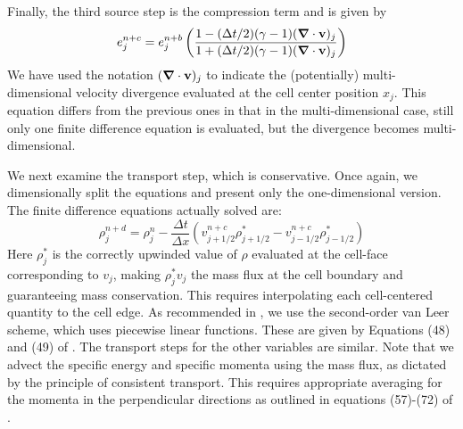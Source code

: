Finally, the third source step is the compression term and is given by
\begin{equation}
e^{n+c}_j = e^{n+b}_j \left( \frac{1 - (\Delta t/2) (\gamma - 1) (\div \vecv)_j }
                           {1 + (\Delta t/2) (\gamma - 1) (\div \vecv)_j } \right)
\end{equation}
We have used the notation $(\bm{\nabla} \cdot \mathbf{v})_j$ to indicate the (potentially) multi-dimensional velocity divergence evaluated at the cell center position $x_j$.  This equation differs from the previous ones in that in the multi-dimensional case, still only one finite difference equation is evaluated, but the divergence becomes multi-dimensional.

We next examine the transport step, which is conservative.  Once again, we dimensionally split the equations and present only the one-dimensional version.  The finite difference equations actually solved are:
\begin{equation}
\rho_j^{n+d} = \rho_j^{n} - \frac{\Delta t}{\Delta x} (v^{n+c}_{j+1/2} \rho^{*}_{j+1/2} - v^{n+c}_{j-1/2} \rho^{*}_{j-1/2} )
\end{equation}
Here $\rho^*_j$ is the correctly upwinded value of $\rho$ evaluated at the cell-face corresponding to $v_j$, making $\rho^*_j v_j$ the mass flux at the cell boundary and guaranteeing mass conservation.   This requires interpolating each cell-centered quantity to the cell edge.  As recommended in \citet{Stone92a}, we use the second-order van Leer scheme, which uses piecewise linear functions.  These are given by Equations (48) and (49) of \citet{Stone92a}.  The transport steps for the other variables are similar.  Note that we advect the specific energy and specific momenta using the mass flux, as dictated by the principle of consistent transport.  This requires appropriate averaging for the momenta in the perpendicular directions as outlined in equations (57)-(72) of \citet{Stone92a}.



